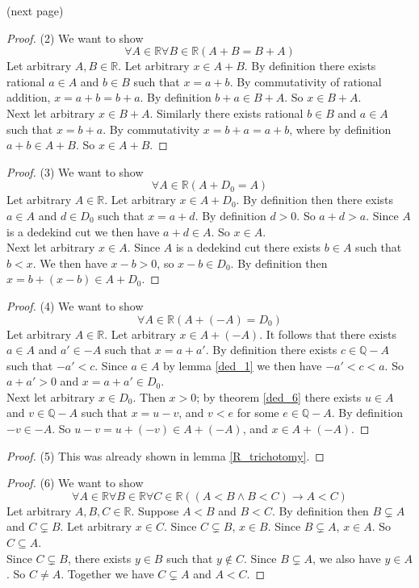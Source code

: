 \documentclass{report}
\begin{document}
\noindent(next page)\newpage
\begin{proof}(2)
We want to show
\begin{equation*}
\forall A\in\mathbb R\forall B\in\mathbb R(A+B=B+A)
\end{equation*}
Let arbitrary $A,B\in\mathbb R$. Let arbitrary $x\in A+B$.
By definition there exists rational $a\in A$ and $b\in B$ such that $x=a+b$. By commutativity of rational addition, $x=a+b=b+a$. By definition 
$b+a\in B+A$. So $x\in B+A$.\\
\indent Next let arbitrary $x\in B+A$. Similarly there exists rational $b\in B$ and $a\in A$ such that $x=b+a$. By commutativity $x=b+a=a+b$, where
by definition $a+b\in A+B$. So $x\in A+B$.
\end{proof}
\begin{proof}(3)
We want to show
\begin{equation*}
\forall A\in\mathbb R(A+D_0=A)
\end{equation*}
Let arbitrary $A\in\mathbb R$.
Let arbitrary $x\in A+D_0$. By definition then there exists $a\in A$ and $d\in D_0$ such that $x=a+d$. By definition $d>0$. So $a+d>a$. 
Since $A$ is a dedekind cut we then have $a+d\in A$. So $x\in A$.\\
\indent Next let arbitrary $x\in A$. Since $A$ is a dedekind cut there exists $b\in A$ such that $b<x$. We then have $x-b>0$, so $x-b\in D_0$.
By definition then $x=b+(x-b)\in A+D_0$.
\end{proof}
\begin{proof}(4)
We want to show
\begin{equation*}
\forall A\in\mathbb R(A+(-A)=D_0)
\end{equation*}
Let arbitrary $A\in\mathbb R$. Let arbitrary $x\in A+(-A)$. It follows that there exists $a\in A$ and $a'\in-A$ such that $x=a+a'$.
By definition there exists $c\in\mathbb Q-A$ such that $-a'<c$. Since $a\in A$ by lemma \ref{ded_1} we then have $-a'<c<a$. 
So $a+a'>0$ and $x=a+a'\in D_0$.\\
\indent Next let arbitrary $x\in D_0$. Then $x>0$; by theorem \ref{ded_6} there exists $u\in A$ and $v\in\mathbb Q-A$ such that $x=u-v$, 
and $v<e$ for some $e\in\mathbb Q-A$. 
By definition $-v\in-A$. So $u-v=u+(-v)\in A+(-A)$, and $x\in A+(-A)$.
\end{proof}
\begin{proof}(5) This was already shown in lemma \ref{R_trichotomy}.
\end{proof}
\begin{proof}(6)
We want to show
\begin{equation*}
\forall A\in\mathbb R\forall B\in\mathbb R\forall C\in\mathbb R((A<B\land B<C)\to A<C)
\end{equation*}
Let arbitrary $A,B,C\in\mathbb R$. Suppose $A<B$ and $B<C$. By definition then $B\subsetneq A$ and $C\subsetneq B$. 
Let arbitrary $x\in C$. Since $C\subsetneq B$, $x\in B$. Since $B\subsetneq A$, $x\in A$. So $C\subseteq A$.\\
\indent Since $C\subsetneq B$, there exists $y\in B$ such that $y\notin C$. Since $B\subsetneq A$, we also have $y\in A$. 
So $C\neq A$. Together we have $C\subsetneq A$ and $A<C$.
\end{proof}
\end{document}

